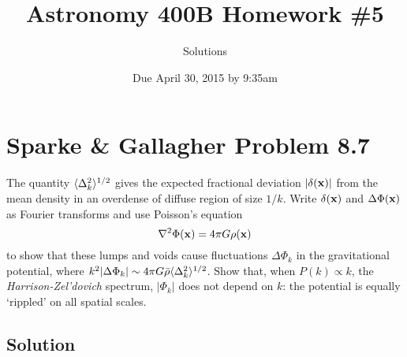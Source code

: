 \documentclass[]{article}
\title{Astronomy 400B Homework \#5}
\author{Solutions}
\date{Due April 30, 2015 by 9:35am}
\begin{document}
\maketitle

\section{Sparke \& Gallagher Problem 8.7}

The quantity $\langle\Delta_k^2\rangle^{1/2}$ gives the expected fractional deviation
$|\delta(\mathbf{x})|$ from the mean density in an overdense of diffuse region of
size $1/k$.  Write $\delta(\mathbf{x})$ and $\Delta \Phi(\mathbf{x})$ as Fourier transforms and
use Poisson's equation
\begin{equation}
\nabla^2 \Phi(\mathbf{x}) = 4\pi G \rho(\mathbf{x})
\end{equation}
\noindent
to show that these lumps and voids cause fluctuations $\Delta\Phi_k$ in the
gravitational potential, where $k^2|\Delta\Phi_k|\sim4\pi G\bar{\rho}\langle\Delta_k^2\rangle^{1/2}$.
Show that, when $P(k)\propto k$, the {\it Harrison-Zel'dovich} spectrum, $|\Phi_k|$ does
not depend on $k$: the potential is equally `rippled' on all spatial scales.

\subsection{Solution}
\end{document}
